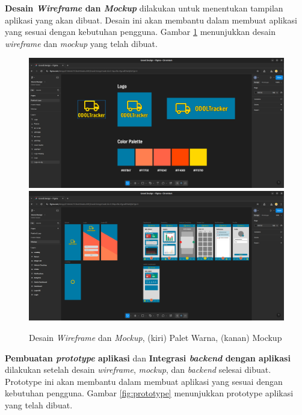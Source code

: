 \textbf{Desain \textit{Wireframe} dan \textit{Mockup}} dilakukan untuk menentukan tampilan aplikasi yang akan dibuat. Desain ini akan membantu dalam membuat aplikasi yang sesuai dengan kebutuhan pengguna. Gambar \ref{fig:wireframe} menunjukkan desain \textit{wireframe} dan \textit{mockup} yang telah dibuat.

\begin{figure}[htbp]
  \centering

  \includegraphics[scale=0.23]{gambar/bab3-color-palette.png}
  \includegraphics[scale=0.23]{gambar/bab3-mockup.png}

  \caption{\centering Desain \textit{Wireframe} dan \textit{Mockup}, (kiri) Palet Warna, (kanan) Mockup}
  \label{fig:wireframe}
\end{figure}

\textbf{Pembuatan \emph{prototype} aplikasi} dan \textbf{Integrasi \emph{backend} dengan aplikasi} dilakukan setelah desain \textit{wireframe}, \textit{mockup}, dan \emph{backend} selesai dibuat. Prototype ini akan membantu dalam membuat aplikasi yang sesuai dengan kebutuhan pengguna. Gambar \ref{fig:prototype} menunjukkan prototype aplikasi yang telah dibuat.

